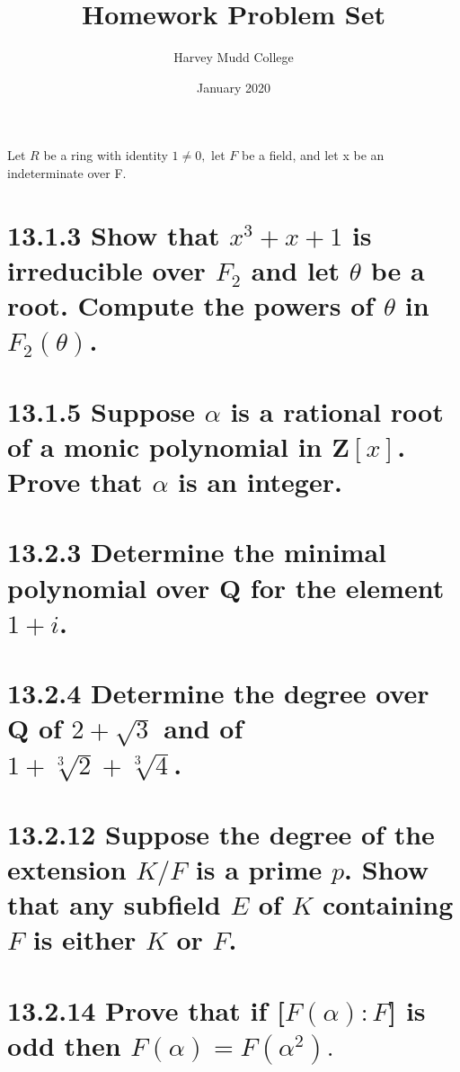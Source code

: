 \documentclass{article}
\title{\textbf{Homework Problem Set \mypound 5}}
\author{Harvey Mudd College}
\date{January 2020}
\begin{document}
\maketitle

\noindent\large{}Let $R$ be a ring with identity $1\neq0,$ let $F$ be a field, and let x be an indeterminate over F.
\color{black}
\section*{\hspace{-1cm}13.1.3\Large{} \color{black} \normalfont Show that $x^3+ x + 1$ is irreducible over $F_2$ and let $\theta$ be a root. Compute the powers of $\theta$ in $F_2(\theta)$.}

\newpage

\section*{\hspace{-1cm}13.1.5\Large{} \color{black} \normalfont Suppose $\alpha$ is a rational root of a monic polynomial in $\mathbf{Z}[x]$. Prove that $\alpha$ is an integer.}
\newpage
\section*{\hspace{-1cm}13.2.3\Large{} \color{black} \normalfont Determine the minimal polynomial over $\mathbf{Q}$ for the element $1 + i$.}
\newpage
\section*{\hspace{-1cm}13.2.4\Large{} \color{black} \normalfont Determine the degree over $\mathbf{Q}$ of $2 + \sqrt{3}$ and of \\$1+\sqrt[3]{2}+\sqrt[3]{4}$.}
\newpage
\color{black}
\section*{\hspace{-1cm}13.2.12\Large{} \color{black} \normalfont Suppose the degree of the extension $K/F$ is a prime $p$. Show that any subfield $E$ of $K$ containing $F$ is either $K$ or $F$.}
\newpage
\section*{\hspace{-1cm}13.2.14\Large{} \color{black} \normalfont Prove that if [$F(\alpha) : F$] is odd then $F(\alpha) =F(\alpha^2).$}
\end{document}
